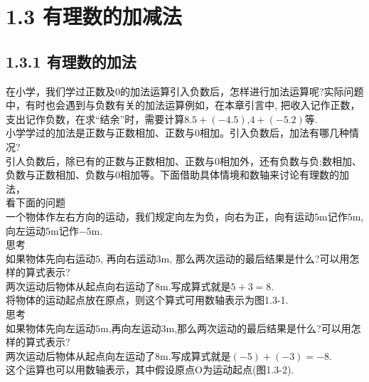 \documentclass{article}
\begin{document}
\maketitle

\section{1.3 有理数的加减法}

\subsection*{1.3.1 有理数的加法}

在小学，我们学过正数及$0$的加法运算引入负数后，怎样进行加法运算呢?实际问题中，有时也会遇到与负数有关的加法运算例如，在本章引言中, 把收入记作正数，支出记作负数，在求“结余”时，需要计算$8.5+(-4.5)$,$4+(-5.2)$等.\\


小学学过的加法是正数与正数相加、正数与$0$相加。引入负数后，加法有哪几种情况?\\

引人负数后，除已有的正数与正数相加、正数与$0$相加外，还有负数与负;数相加、负数与正数相加、负数与$0$相加等。下面借助具体情境和数轴来讨论有理数的加法，\\
看下面的问题\\
一个物体作左右方向的运动，我们规定向左为负，向右为正，向有运动$5$m记作$5$m,向左运动$5$m记作$-5$m.\\


思考\\

如果物体先向右运动$5$, 再向右运动$3$m, 那么两次运动的最后结果是什么?可以用怎样的算式表示?\\

两次运动后物体从起点向右运动了$8$m.写成算式就是$5+3=8$.\\

将物体的运动起点放在原点，则这个算式可用数轴表示为图1.3-1.\\



思考\\

如果物体先向左运动$5$m,再向左运动$3$m,那么两次运动的最后结果是什么?可以用怎样的算式表示? \\

两次运动后物体从起点向左运动了8m.写成算式就是$(-5)+(-3)=- 8$.\\

这个运算也可以用数轴表示，其中假设原点O为运动起点(图1.3-2).\\
\end{document}
